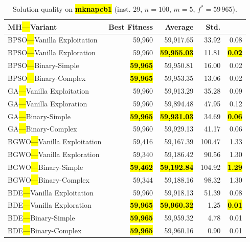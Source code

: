 \documentclass[mathematics,article,accept,moreauthors]{Definitions/mdpi}
\begin{document}
\begin{table}[H]
  \small
  \caption{Solution quality on \textbf{\hl{mknapcb1}} (inst. 29, $n=100$, $m=5$, $f^*=59\,965$).}
  \label{tab:calidad_mknapcb1_29}
  \begin{tabularx}{\textwidth}{lRRRR}
    \toprule
    \textbf{MH\hl{---}Variant} &
    \textbf{Best Fitness} &
    \textbf{Average} &
    \textbf{Std.} &
    \textbf{} \\
    \midrule
    BPSO\hl{---}Vanilla Exploitation &          59,960 &         59,917.65 &  33.92 &         0.08 \\
    BPSO\hl{---}Vanilla Exploration  &          59,960 & \textbf{\hl{59,955.03}} &  11.81 & \textbf{\hl{0.02}} \\
    BPSO\hl{---}Binary-Simple        & \textbf{\hl{59,965}} &         59,950.81 &  16.00 &         0.02 \\
    BPSO\hl{---}Binary-Complex       & \textbf{\hl{59,965}} &         59,953.35 &  13.06 &         0.02 \\
    \midrule
    GA\hl{---}Vanilla Exploitation   &          59,960 &         59,913.29 &  35.28 &         0.09 \\
    GA\hl{---}Vanilla Exploration    &          59,960 &         59,894.48 &  47.95 &         0.12 \\
    GA\hl{---}Binary-Simple          & \textbf{\hl{59,965}} & \textbf{\hl{59,931.03}} &  34.69 & \textbf{\hl{0.06}} \\
    GA\hl{---}Binary-Complex         &          59,960 &         59,929.13 &  41.17 &         0.06 \\
    \midrule
    BGWO\hl{---}Vanilla Exploitation &          59,416 &         59,167.39 & 100.47 &         1.33 \\
    BGWO\hl{---}Vanilla Exploration  &          59,340 &         59,186.42 &  90.56 &         1.30 \\
    BGWO\hl{---}Binary-Simple        & \textbf{\hl{59,462}} & \textbf{\hl{59,192.84}} & 104.92 & \textbf{\hl{1.29}} \\
    BGWO\hl{---}Binary-Complex       &          59,344 &         59,188.16 &  98.32 &         1.30 \\
    \midrule
    BDE\hl{---}Vanilla Exploitation  &          59,960 &         59,918.13 &  51.39 &         0.08 \\
    BDE\hl{---}Vanilla Exploration   & \textbf{\hl{59,965}} & \textbf{\hl{59,960.32}} &   1.25 & \textbf{\hl{0.01}} \\
    BDE\hl{---}Binary-Simple         & \textbf{\hl{59,965}} &         59,959.32 &   4.78 &         0.01 \\
    BDE\hl{---}Binary-Complex        & \textbf{\hl{59,965}} &         59,960.16 &   0.90 &         0.01 \\
    \bottomrule
  \end{tabularx}
\end{table}
\end{document}
